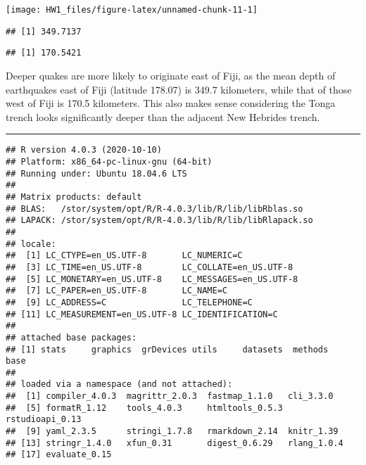 \documentclass[
]{article}
\newenvironment{Shaded}{\begin{snugshade}}{\end{snugshade}}
\newcommand{\CommentTok}[1]{\textcolor[rgb]{0.56,0.35,0.01}{\textit{#1}}}
\newcommand{\FloatTok}[1]{\textcolor[rgb]{0.00,0.00,0.81}{#1}}
\newcommand{\FunctionTok}[1]{\textcolor[rgb]{0.00,0.00,0.00}{#1}}
\newcommand{\NormalTok}[1]{#1}
\newcommand{\SpecialCharTok}[1]{\textcolor[rgb]{0.00,0.00,0.00}{#1}}
\begin{document}
\begin{center}\texttt{[image: HW1\_files/figure-latex/unnamed-chunk-11-1]} \end{center}

\begin{Shaded}
\end{Shaded}

\begin{verbatim}
## [1] 349.7137
\end{verbatim}

\begin{Shaded}
\end{Shaded}

\begin{verbatim}
## [1] 170.5421
\end{verbatim}

Deeper quakes are more likely to originate east of Fiji, as the mean
depth of earthquakes east of Fiji (latitude 178.07) is 349.7 kilometers,
while that of those west of Fiji is 170.5 kilometers. This also makes
sense considering the Tonga trench looks significantly deeper than the
adjacent New Hebrides trench.

\begin{center}\rule{0.5\linewidth}{0.5pt}\end{center}

\begin{verbatim}
## R version 4.0.3 (2020-10-10)
## Platform: x86_64-pc-linux-gnu (64-bit)
## Running under: Ubuntu 18.04.6 LTS
## 
## Matrix products: default
## BLAS:   /stor/system/opt/R/R-4.0.3/lib/R/lib/libRblas.so
## LAPACK: /stor/system/opt/R/R-4.0.3/lib/R/lib/libRlapack.so
## 
## locale:
##  [1] LC_CTYPE=en_US.UTF-8       LC_NUMERIC=C              
##  [3] LC_TIME=en_US.UTF-8        LC_COLLATE=en_US.UTF-8    
##  [5] LC_MONETARY=en_US.UTF-8    LC_MESSAGES=en_US.UTF-8   
##  [7] LC_PAPER=en_US.UTF-8       LC_NAME=C                 
##  [9] LC_ADDRESS=C               LC_TELEPHONE=C            
## [11] LC_MEASUREMENT=en_US.UTF-8 LC_IDENTIFICATION=C       
## 
## attached base packages:
## [1] stats     graphics  grDevices utils     datasets  methods   base     
## 
## loaded via a namespace (and not attached):
##  [1] compiler_4.0.3  magrittr_2.0.3  fastmap_1.1.0   cli_3.3.0      
##  [5] formatR_1.12    tools_4.0.3     htmltools_0.5.3 rstudioapi_0.13
##  [9] yaml_2.3.5      stringi_1.7.8   rmarkdown_2.14  knitr_1.39     
## [13] stringr_1.4.0   xfun_0.31       digest_0.6.29   rlang_1.0.4    
## [17] evaluate_0.15
\end{verbatim}
\end{document}
